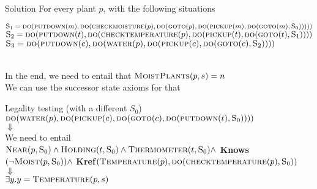 \begin{frame}{Solution}
    \vspace*{-1cm}
    For every plant $p$, with the following situations
    \hspace*{-1cm}
    \centering
    \begin{minipage}{0.8\linewidth}
        \vspace{5pt}
        $\textsc{S}_1 = \\ \textsc{do}(\textsc{putdown}(m),\textsc{do}(\textsc{checkmoisture}(p), \\\textsc{do}(\textsc{goto}(p),\textsc{do}(\textsc{pickup}(m),\textsc{do}(\textsc{goto}(m),\textsc{S}_0)))))$ \\
        $\textsc{S}_2 = \\ \textsc{do}(\textsc{putdown}(t),\textsc{do}(\textsc{checktemperature}(p), \\\textsc{do}(\textsc{pickup}(t),\textsc{do}(\textsc{goto}(t),\textsc{S}_1))))$ \\
        $\textsc{S}_3 = \\ \textsc{do}(\textsc{putdown}(c),\textsc{do}(\textsc{water}(p), \\\textsc{do}(\textsc{pickup}(c),\textsc{do}(\textsc{goto}(c),\textsc{S}_2))))$
    \end{minipage} \\
    \vspace{15pt}
    In the end, we need to entail that $\textsc{MoistPlants}(p, s) = n$ \\
    We can use the successor state axioms for that
\end{frame}

\begin{frame}{Legality testing (with a different $S_0$)}
    \centering
    $\textsc{do}(\textsc{water}(p), \textsc{do}(\textsc{pickup}(c),\textsc{do}(\textsc{goto}(c),\textsc{do}(\textsc{putdown}(t),\textsc{S}_0))))$ \\
    $\Downarrow$ \\
    We need to entail \\$\textsc{Near}(p,\textsc{S}_0) \land \textsc{Holding}(t,\textsc{S}_0) \land 
    \textsc{Thermometer}(t,\textsc{S}_0) \land$ \textbf{Knows}$(\neg \textsc{Moist}(p,\textsc{S}_0)) \land$ \textbf{Kref}$(\textsc{Temperature}(p),\textsc{do}(\textsc{checktemperature}(p),\textsc{S}_0))$ \\
    $\Downarrow$ \\
    $\exists y.y = \textsc{Temperature}(p,s)$
\end{frame}


